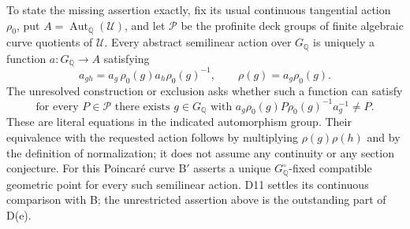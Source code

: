 To state the missing assertion exactly, fix its usual continuous
tangential action $\rho_0$, put
$A=\operatorname{Aut}_{\overline{\mathbb Q}}(\mathcal U)$, and let
$\mathscr P$ be the profinite deck groups of finite algebraic curve
quotients of $\mathcal U$.  Every abstract semilinear action over
$G_{\mathbb Q}$ is uniquely a function $a:G_{\mathbb Q}\to A$ satisfying
\[
 a_{gh}=a_g\,\rho_0(g)a_h\rho_0(g)^{-1},
 \qquad \rho(g)=a_g\rho_0(g).
\]
The unresolved construction or exclusion asks whether such a function
can satisfy
\[
 \text{for every }P\in\mathscr P\text{ there exists }g\in G_{\mathbb Q}
 \text{ with }a_g\rho_0(g)P\rho_0(g)^{-1}a_g^{-1}\ne P.
\]
These are literal equations in the indicated automorphism group.
Their equivalence with the requested action follows by multiplying
$\rho(g)\rho(h)$ and by the definition of normalization; it does not
assume any continuity or any section conjecture.
For this Poincar\'e curve B$'$ asserts a unique
$G_{\mathbb Q}^\circ$-fixed compatible geometric point for every such
semilinear action.  D11 settles its continuous comparison with B;
the unrestricted assertion above is the outstanding part of D(e).
